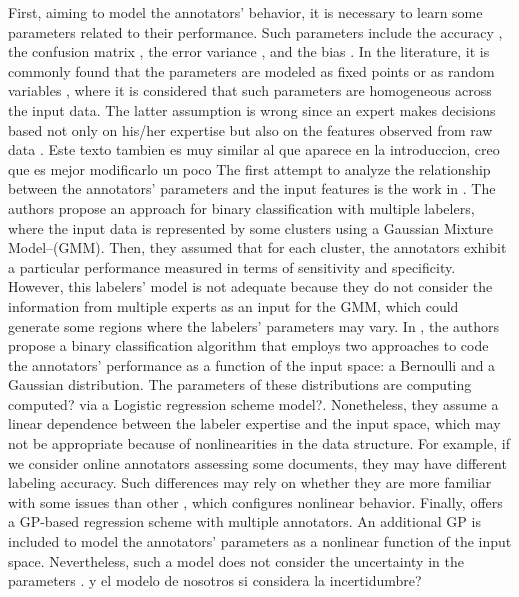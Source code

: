 \documentclass[journal]{IEEEtran}
\newcommand{\comment}[2]{{\color{blue}#1} {\color{red}#2}}
\begin{document}
\comment{First, aiming to model the annotators' behavior, it is
  necessary to learn some parameters related to their
  performance. Such parameters include the accuracy
  \cite{rodrigues2013learning}, the confusion matrix
  \cite{gonzalez2015automatic}, the error variance
  \cite{raykar2010learning}, and the bias
  \cite{rodrigues2017learning}. In the literature, it is commonly
  found that the parameters are modeled as fixed points
  \cite{rodrigues2014gaussian} or as random variables
  \cite{morales2019scalable}, where it is considered that such
  parameters are homogeneous across the input data. The latter
  assumption is wrong since an expert makes decisions based not only
  on his/her expertise but also on the features observed from raw data
  \cite{raykar2010learning}.  }{Este texto tambien es muy similar al
  que aparece en la introduccion, creo que es mejor modificarlo un
  poco} The first attempt to analyze the relationship between the
annotators' parameters and the input features is the work in
\cite{zhang2011learning}. The authors propose an approach for binary
classification with multiple labelers, where the input data is
represented by some clusters using a Gaussian Mixture
Model--(GMM). Then, they assumed that for each cluster, the annotators
exhibit a particular performance measured in terms of sensitivity and
specificity. However, this labelers' model is not adequate because
they do not consider the information from multiple experts as an input
for the GMM, which could generate some regions where the labelers'
parameters may vary. In \cite{yan2014learning}, the authors propose a
binary classification algorithm that employs two approaches to code
the annotators' performance as a function of the input space: a
Bernoulli and a Gaussian distribution. The parameters of these
distributions are \comment{computing}{computed?} via a Logistic regression
\comment{scheme}{model?}. Nonetheless, they assume a linear dependence between the
labeler expertise and the input space, which may not be appropriate
because of nonlinearities in the data structure. For example, if we
consider online annotators assessing some documents, they may have
different labeling accuracy. Such differences may rely on whether they
are more familiar with some issues than other \cite{wang2016bi}, which
configures nonlinear behavior. Finally, \cite{xiao2013learning} offers
a GP-based regression scheme with multiple annotators. \comment{An additional
GP is included to model the annotators' parameters as a nonlinear
function of the input space. Nevertheless, such a model does not
consider the uncertainty in the parameters \cite{bishop2006pattern}.}{y el modelo de nosotros si considera la incertidumbre?}
\end{document}
